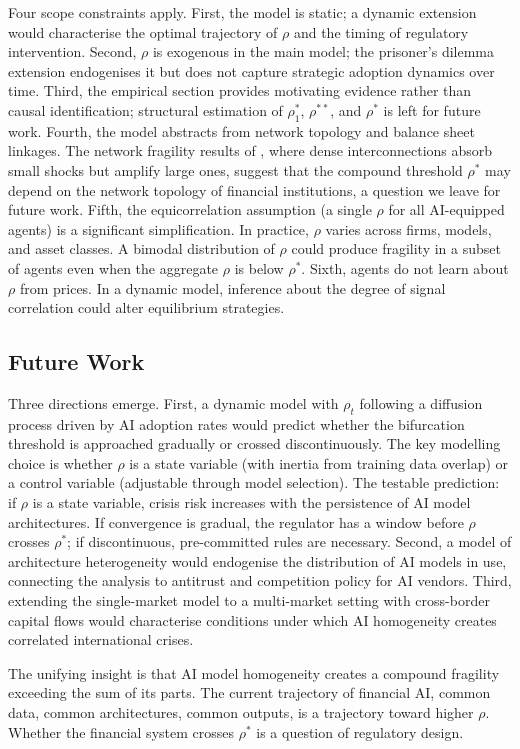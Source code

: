 Four scope constraints apply. First, the model is static; a dynamic extension would characterise the optimal trajectory of $\rho$ and the timing of regulatory intervention. Second, $\rho$ is exogenous in the main model; the prisoner's dilemma extension endogenises it but does not capture strategic adoption dynamics over time. Third, the empirical section provides motivating evidence rather than causal identification; structural estimation of $\rho_1^*$, $\rho^{**}$, and $\rho^*$ is left for future work. Fourth, the model abstracts from network topology and balance sheet linkages. The network fragility results of \citet{acemoglu2015}, where dense interconnections absorb small shocks but amplify large ones, suggest that the compound threshold $\rho^*$ may depend on the network topology of financial institutions, a question we leave for future work. Fifth, the equicorrelation assumption (a single $\rho$ for all AI-equipped agents) is a significant simplification. In practice, $\rho$ varies across firms, models, and asset classes. A bimodal distribution of $\rho$ could produce fragility in a subset of agents even when the aggregate $\rho$ is below $\rho^*$. Sixth, agents do not learn about $\rho$ from prices. In a dynamic model, inference about the degree of signal correlation could alter equilibrium strategies.

\subsection{Future Work}

Three directions emerge. First, a dynamic model with $\rho_t$ following a diffusion process driven by AI adoption rates would predict whether the bifurcation threshold is approached gradually or crossed discontinuously. The key modelling choice is whether $\rho$ is a state variable (with inertia from training data overlap) or a control variable (adjustable through model selection). The testable prediction: if $\rho$ is a state variable, crisis risk increases with the persistence of AI model architectures. If convergence is gradual, the regulator has a window before $\rho$ crosses $\rho^*$; if discontinuous, pre-committed rules are necessary. Second, a model of architecture heterogeneity would endogenise the distribution of AI models in use, connecting the analysis to antitrust and competition policy for AI vendors. Third, extending the single-market model to a multi-market setting with cross-border capital flows would characterise conditions under which AI homogeneity creates correlated international crises.

The unifying insight is that AI model homogeneity creates a compound fragility exceeding the sum of its parts. The current trajectory of financial AI, common data, common architectures, common outputs, is a trajectory toward higher $\rho$. Whether the financial system crosses $\rho^*$ is a question of regulatory design.
